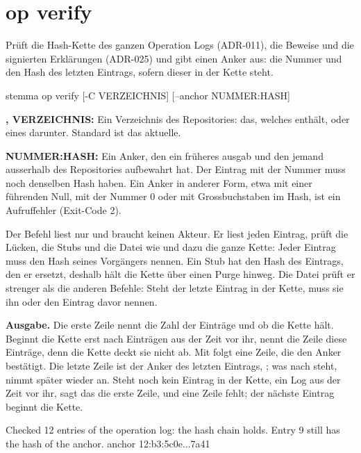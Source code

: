 \section{op verify}

Prüft die Hash-Kette des ganzen Operation Logs (ADR-011), die Beweise und die signierten
Erklärungen (ADR-025) und gibt einen Anker aus: die Nummer
und den Hash des letzten Eintrags, sofern dieser in der Kette steht.

\starttyping
stemma op verify [-C VERZEICHNIS] [--anchor NUMMER:HASH]
\stoptyping

\startitemize
\item {\bf {},  VERZEICHNIS:} Ein Verzeichnis des Repositories:
das, welches  enthält, oder eines darunter. Standard ist das aktuelle.
\item {\bf {} NUMMER:HASH:} Ein Anker, den ein früheres 
ausgab und den jemand ausserhalb des Repositories aufbewahrt hat. Der Eintrag mit der Nummer
muss noch denselben Hash haben. Ein Anker in anderer Form, etwa mit einer führenden Null, mit
der Nummer 0 oder mit Grossbuchstaben im Hash, ist ein Aufruffehler (Exit-Code 2).
\stopitemize

Der Befehl liest nur und braucht keinen Akteur. Er liest jeden Eintrag, prüft die Lücken,
die Stubs und die Datei  wie  und dazu die ganze Kette: Jeder
Eintrag muss den Hash seines Vorgängers nennen. Ein Stub hat den Hash des Eintrags, den er
ersetzt, deshalb hält die Kette über einen Purge hinweg. Die Datei  prüft
er strenger als die anderen Befehle: Steht der letzte Eintrag in der Kette, muss sie ihn oder
den Eintrag davor nennen.

{\bf Ausgabe.} Die erste Zeile nennt die Zahl der Einträge und ob die Kette hält. Beginnt
die Kette erst nach Einträgen aus der Zeit vor ihr, nennt die Zeile diese Einträge, denn die
Kette deckt sie nicht ab. Mit  folgt eine Zeile, die den Anker bestätigt.
Die letzte Zeile ist der Anker des letzten Eintrags, ; was nach
 steht, nimmt  später wieder an. Steht noch kein Eintrag in der
Kette, ein Log aus der Zeit vor ihr, sagt das die erste Zeile, und eine Zeile
 fehlt; der nächste Eintrag beginnt die Kette.

\starttyping
Checked 12 entries of the operation log: the hash chain holds.
Entry 9 still has the hash of the anchor.
anchor 12:b3:5c0e...7a41
\stoptyping


